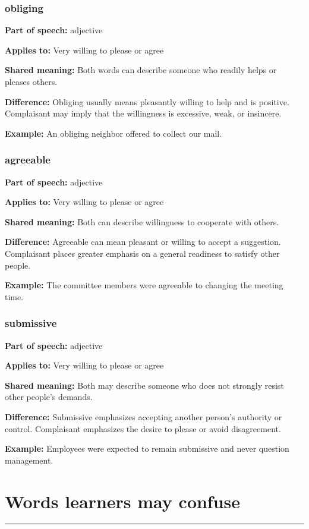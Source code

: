 \documentclass[11pt]{article}
\newcommand{\sectionrule}{\par\vspace{-0.5em}\noindent\textcolor{Accent}{\rule{\linewidth}{0.6pt}}\par}
\begin{document}
\subsubsection{obliging}
\textbf{Part of speech:} adjective

\textbf{Applies to:} Very willing to please or agree

\textbf{Shared meaning:} Both words can describe someone who readily helps or pleases others.

\textbf{Difference:} Obliging usually means pleasantly willing to help and is positive. Complaisant may imply that the willingness is excessive, weak, or insincere.

\textbf{Example:} An obliging neighbor offered to collect our mail.

\subsubsection{agreeable}
\textbf{Part of speech:} adjective

\textbf{Applies to:} Very willing to please or agree

\textbf{Shared meaning:} Both can describe willingness to cooperate with others.

\textbf{Difference:} Agreeable can mean pleasant or willing to accept a suggestion. Complaisant places greater emphasis on a general readiness to satisfy other people.

\textbf{Example:} The committee members were agreeable to changing the meeting time.

\subsubsection{submissive}
\textbf{Part of speech:} adjective

\textbf{Applies to:} Very willing to please or agree

\textbf{Shared meaning:} Both may describe someone who does not strongly resist other people's demands.

\textbf{Difference:} Submissive emphasizes accepting another person's authority or control. Complaisant emphasizes the desire to please or avoid disagreement.

\textbf{Example:} Employees were expected to remain submissive and never question management.

\section{Words learners may confuse}
\sectionrule
\end{document}
